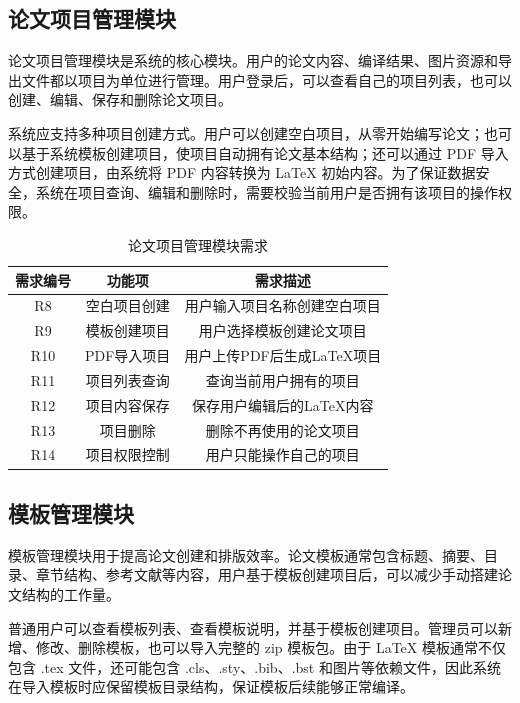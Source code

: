 \documentclass{xduugthesis}
\begin{document}
\subsection{论文项目管理模块}
论文项目管理模块是系统的核心模块。用户的论文内容、编译结果、图片资源和导出文件都以项目为单位进行管理。用户登录后，可以查看自己的项目列表，也可以创建、编辑、保存和删除论文项目。

系统应支持多种项目创建方式。用户可以创建空白项目，从零开始编写论文；也可以基于系统模板创建项目，使项目自动拥有论文基本结构；还可以通过 PDF 导入方式创建项目，由系统将 PDF 内容转换为 LaTeX 初始内容。为了保证数据安全，系统在项目查询、编辑和删除时，需要校验当前用户是否拥有该项目的操作权限。

\begin{table}[H]
    \centering
    \caption{论文项目管理模块需求}
    \label{tab:project-requirement}
    \begin{tabular}{|c|c|c|}
        \hline
        需求编号 & 功能项 & 需求描述 \\
        \hline
        R8 & 空白项目创建 & 用户输入项目名称创建空白项目 \\
        \hline
        R9 & 模板创建项目 & 用户选择模板创建论文项目 \\
        \hline
        R10 & PDF导入项目 & 用户上传PDF后生成LaTeX项目 \\
        \hline
        R11 & 项目列表查询 & 查询当前用户拥有的项目 \\
        \hline
        R12 & 项目内容保存 & 保存用户编辑后的LaTeX内容 \\
        \hline
        R13 & 项目删除 & 删除不再使用的论文项目 \\
        \hline
        R14 & 项目权限控制 & 用户只能操作自己的项目 \\
        \hline
    \end{tabular}
\end{table}

\subsection{模板管理模块}
模板管理模块用于提高论文创建和排版效率。论文模板通常包含标题、摘要、目录、章节结构、参考文献等内容，用户基于模板创建项目后，可以减少手动搭建论文结构的工作量。

普通用户可以查看模板列表、查看模板说明，并基于模板创建项目。管理员可以新增、修改、删除模板，也可以导入完整的 zip 模板包。由于 LaTeX 模板通常不仅包含 .tex 文件，还可能包含 .cls、.sty、.bib、.bst 和图片等依赖文件，因此系统在导入模板时应保留模板目录结构，保证模板后续能够正常编译。
\end{document}
